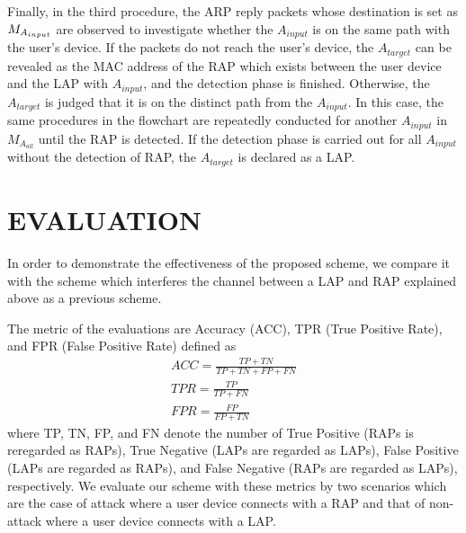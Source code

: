 \documentclass[conference]{IEEEtran}
\newcommand{\inputAP}{A_{input}}
\newcommand{\tarAP}{A_{target}}
\begin{document}
Finally, in the third procedure, the ARP reply packets whose destination is set as $M_{A_{input}}$ are observed to investigate whether the $\inputAP$ is on the same path with the user's device.
If the packets do not reach the user's device, the $\tarAP$ can be revealed as the MAC address of the RAP which exists between the user device and the LAP with  $\inputAP$, and the detection phase is finished.
Otherwise, the $\tarAP$ is judged that it is on the distinct path from the $\inputAP$.
In this case, the same procedures in the flowchart are repeatedly conducted for another $\inputAP$ in $M_{A_{all}}$ until the RAP is detected.
If the detection phase is carried out for all $\inputAP$ without the detection of RAP, the $\tarAP$ is declared as a LAP. 

\section{EVALUATION}\label{sec:5}
In order to demonstrate the effectiveness of the proposed scheme, we compare it with the scheme \cite{previous} which interferes the channel between a LAP and RAP explained above as a previous scheme.

The metric of the evaluations are Accuracy (ACC), TPR (True Positive Rate), and FPR (False Positive Rate) defined as
\begin{gather}
    ACC = \frac{TP + TN}{TP + TN + FP + FN} \\
    TPR = \frac{TP}{TP + FN} \\
    FPR = \frac{FP}{FP + TN}
\end{gather}
where TP, TN, FP, and FN denote the number of True Positive (RAPs is reregarded as RAPs), True Negative (LAPs are regarded as LAPs), False Positive (LAPs are regarded as RAPs), and False Negative (RAPs are regarded as LAPs), respectively.
We evaluate our scheme with these metrics by two scenarios which are the case of attack where a user device connects with a RAP and that of non-attack where a user device connects with a LAP.
\end{document}

